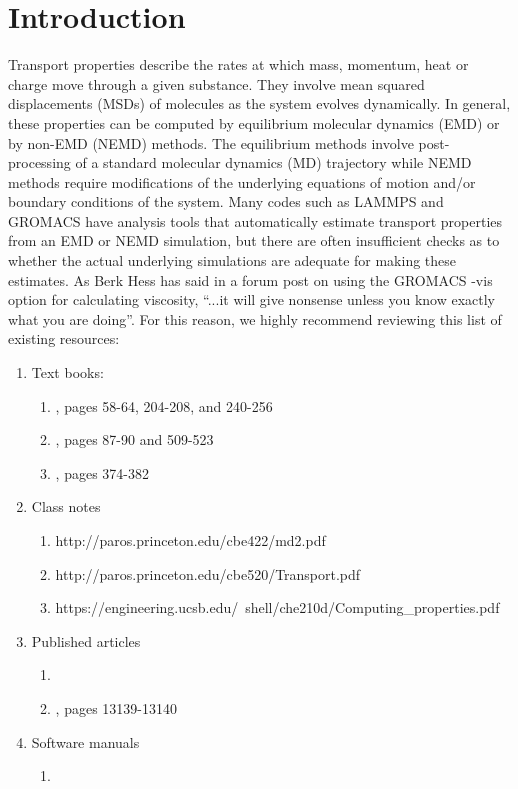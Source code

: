 \documentclass[9pt]{livecoms}
\begin{document}
\section{Introduction}

Transport properties describe the rates at which mass, momentum, heat or charge move through a given substance. They involve mean squared displacements (MSDs) of molecules as the system evolves dynamically. In general, these properties can be computed by equilibrium molecular dynamics (EMD) or by non-EMD (NEMD) methods. The equilibrium methods involve post-processing of a standard molecular dynamics (MD) trajectory while NEMD methods require modifications of the underlying equations of motion and/or boundary conditions of the system. Many codes such as LAMMPS and GROMACS have analysis tools that automatically estimate transport properties from an EMD or NEMD simulation, but there are often insufficient checks as to whether the actual underlying simulations are adequate for making these estimates. As Berk Hess has said in a forum post on using the GROMACS -vis option for calculating viscosity, ``...it will give nonsense unless you know exactly what you are doing''. For this reason, we highly recommend reviewing this list of existing resources:
\begin{enumerate}
	\item Text books:
	\begin{enumerate}
		\item \cite{Allen1987}, pages 58-64, 204-208, and 240-256
		\item \cite{Frenkel2002}, pages 87-90 and 509-523
		\item \cite{Leach2001}, pages 374-382
	\end{enumerate}
	\item Class notes
	\begin{enumerate}
		\item http://paros.princeton.edu/cbe422/md2.pdf
		\item http://paros.princeton.edu/cbe520/Transport.pdf
		\item https://engineering.ucsb.edu/~shell/che210d/Computing\_properties.pdf
	\end{enumerate}
	\item Published articles
	\begin{enumerate}
		\item \cite{Hess2002}
		\item \cite{Nieto2015}, pages 13139-13140
	\end{enumerate}
	\item Software manuals
	\begin{enumerate}
		\item 
	\end{enumerate}
\end{enumerate}
\end{document}
